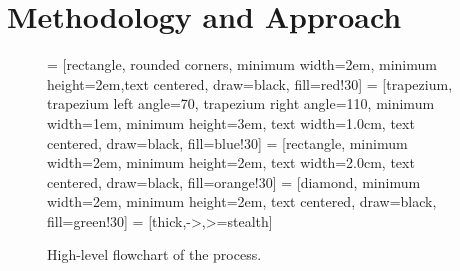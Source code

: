 \chapter{Methodology and Approach}
\label{ch:method}

\begin{figure}[!ht]
  \centering

 = [rectangle, rounded corners, minimum width=2em, minimum height=2em,text centered, draw=black, fill=red!30]
 = [trapezium, trapezium left angle=70, trapezium right angle=110, minimum width=1em, minimum height=3em, text width=1.0cm, text centered, draw=black, fill=blue!30]
 = [rectangle, minimum width=2em, minimum height=2em, text width=2.0cm, text centered, draw=black, fill=orange!30]
 = [diamond, minimum width=2em, minimum height=2em, text centered, draw=black, fill=green!30]
 = [thick,->,>=stealth]



\caption{High-level flowchart of the process. \label{fig:highlevelflowchart}}
\end{figure}

